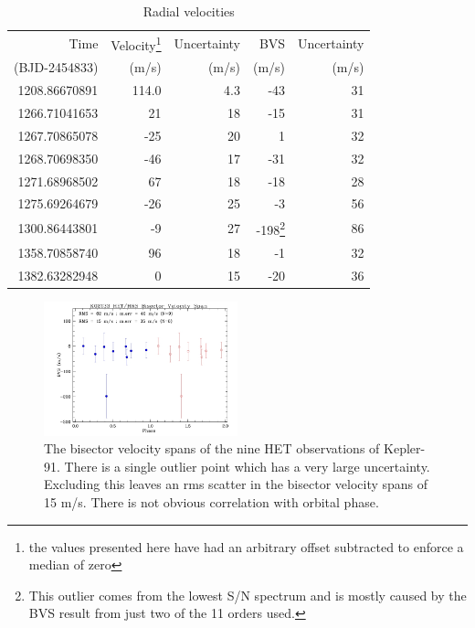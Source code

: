 \documentclass[apjl]{emulateapj}
\begin{document}


\begin{table}\label{tab:rv}
\centering
\caption{Radial velocities}
\begin{tabular}{r r r r r}
Time & Velocity\footnote{the values presented here have had an arbitrary offset subtracted to enforce a median of zero}  & Uncertainty & BVS& Uncertainty \\
(BJD-2454833) & (m/s) & (m/s) & (m/s) & (m/s)\\
\hline
1208.86670891		&	114.0 	&	4.3		&	-43	&	31\\
1266.71041653		& 	21		&	18		&	-15	&	31\\
1267.70865078		&	-25 		&	20		&	1	&	32\\
1268.70698350		&	-46		&	17		&	-31	&	32\\
1271.68968502		&	67		&	18		&	-18	&	28\\
1275.69264679		&	-26		&	25		&	-3	&	56\\
1300.86443801 	& 	-9		&	27		&	-198\footnote{This outlier comes from the lowest S/N spectrum and is mostly caused by the BVS result from just two of the 11 orders used.}	&	86\\
1358.70858740 	& 	96		&	18		&	-1	&	32\\
1382.63282948 	& 	0		&	15		&	-20	&	36\\
\hline
\end{tabular}
\end{table}


\begin{figure}
\includegraphics[width=0.50\textwidth]{k02133_bvs_phas1.jpg}
\caption{The bisector velocity spans of the nine HET observations of Kepler-91. There is a single outlier point which has a very large uncertainty. Excluding this leaves an rms scatter in the bisector velocity spans of 15 m/s. There is not obvious correlation with orbital phase.}
\label{fig:bisectors}
\end{figure}
\end{document}
